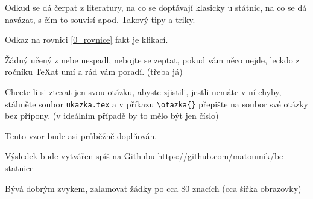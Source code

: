 \begin{poznamky} %
\item Odkud se dá čerpat z literatury, na co se doptávají klasicky u státnic, na co se dá navázat, s čím to souvisí apod. Takový tipy a triky.
\item Odkaz na rovnici \eqref{0_rovnice} fakt je klikací.
\item Žádný učený z nebe nespadl, nebojte se zeptat, pokud vám něco nejde, leckdo z ročníku \TeX at umí a rád vám poradí. (třeba já)
\item Chcete-li si ztexat jen svou otázku, abyste zjistili, jestli nemáte v ní chyby,  stáhněte soubor \verb"ukazka.tex" a v příkazu \verb"\otazka{}" přepište  na soubor své otázky bez přípony. (v ideálním případě by to mělo být jen číslo) 
\item Tento vzor bude asi průběžně doplňován.
\item Výsledek bude vytvářen spíš na Githubu \url{https://github.com/matoumik/bc-statnice}
\item Bývá dobrým zvykem, zalamovat žádky po cca 80 znacích (cca šířka obrazovky)
\end{poznamky}

